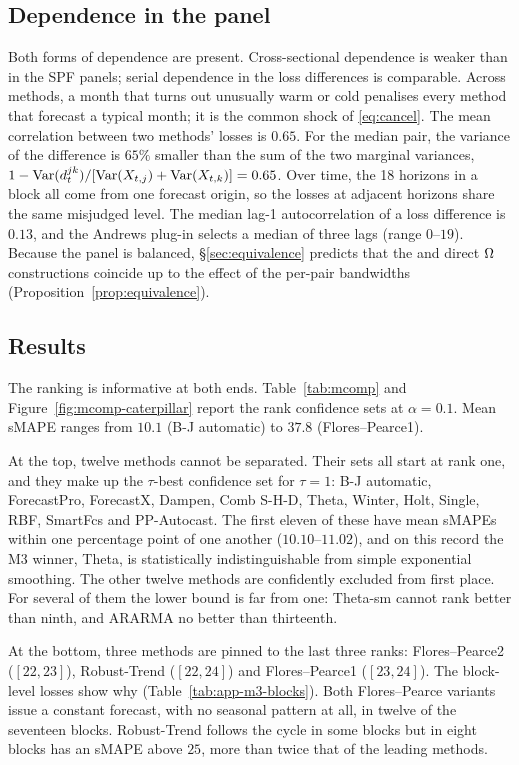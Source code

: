 \subsection{Dependence in the panel}
\label{sec:apps-mcomp-dependence}

Both forms of dependence are present. Cross-sectional dependence is weaker than in the
SPF panels; serial dependence in the loss differences is comparable.
Across methods, a month that turns out unusually warm or cold penalises every method
that forecast a typical month; it is the common shock of \eqref{eq:cancel}.
The mean correlation between two methods' losses is $0.65$. For the median pair, the
variance of the difference is $65\%$ smaller than the sum of the two marginal variances,
$1-\operatorname{Var}(d^{jk}_t)/[\operatorname{Var}(X_{t,j})+\operatorname{Var}(X_{t,k})]=0.65$. Over time, the 18 horizons in
a block all come from one forecast origin, so the losses at adjacent horizons share the
same misjudged level. The median lag-1 autocorrelation of a loss difference is $0.13$,
and the Andrews plug-in selects a median of three lags (range $0$--$19$). Because the
panel is balanced, \S\ref{sec:equivalence} predicts that the \MDS{} and direct
$\Omega$ constructions coincide up to the effect of the per-pair bandwidths
(Proposition~\ref{prop:equivalence}).

\subsection{Results}
\label{sec:apps-mcomp-results}

The ranking is informative at both ends. Table~\ref{tab:mcomp} and
Figure~\ref{fig:mcomp-caterpillar} report the rank confidence sets at $\alpha=0.1$.
Mean sMAPE ranges from $10.1$ (B-J automatic) to $37.8$ (Flores--Pearce1).

At the top, twelve methods cannot be separated. Their sets all start at rank one, and
they make up the $\tau$-best confidence set for $\tau=1$: B-J automatic, ForecastPro,
ForecastX, Dampen, Comb S-H-D, Theta, Winter, Holt, Single, RBF, SmartFcs and
PP-Autocast. The first eleven of these have mean sMAPEs within one percentage point of
one another ($10.10$--$11.02$), and on this record the M3 winner, Theta, is statistically
indistinguishable from simple exponential smoothing. The other twelve methods are
confidently excluded from first place. For several of them the lower bound is far from
one: Theta-sm cannot rank better than ninth, and ARARMA no better than thirteenth.

At the bottom, three methods are pinned to the last three ranks: Flores--Pearce2
($[22,23]$), Robust-Trend ($[22,24]$) and Flores--Pearce1 ($[23,24]$). The block-level
losses show why (Table~\ref{tab:app-m3-blocks}). Both Flores--Pearce variants issue a
constant forecast, with no seasonal pattern at all, in twelve of the seventeen blocks.
Robust-Trend follows the cycle in some blocks but in eight blocks has an sMAPE above
$25$, more than twice that of the leading methods.

